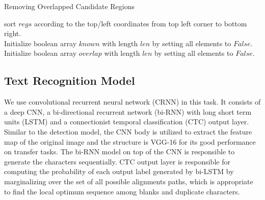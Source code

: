 \documentclass[sigconf]{acmart}
\begin{document}
\begin{algorithm}[htb]
	\caption{Removing Overlapped Candidate Regions}
	\label{algorithm2}
	\raggedright
	
	sort $regs$ according to the top/left coordinates from top left corner to bottom right.\\
	Initialize boolean array $known$ with length $len$ by setting all elements to $False$.\\
	Initialize boolean array $overlap$ with length $len$ by setting all elements to $False$.\\
	
\end{algorithm}

\subsection{Text Recognition Model}
We use convolutional recurrent neural network (CRNN) \cite{shi2017end} in this task. It consists of a deep CNN, a bi-directional recurrent network (bi-RNN) with long short term units (LSTM) and a connectionist temporal classification (CTC) \cite{graves2006connectionist} output layer. Similar to the detection model, the CNN body is utilized to extract the feature map of the original image and the structure is VGG-16 for its good performance on transfer tasks. The bi-RNN model on top of the CNN is responsible to generate the characters sequentially. CTC output layer is responsible for computing the probability of each output label generated by bi-LSTM by marginalizing over the set of all possible alignments paths, which is appropriate to find the local optimum sequence among blanks and duplicate characters.
\end{document}
